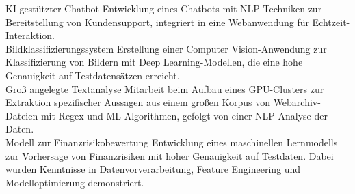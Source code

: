 \documentclass[9pt,a4paper,ragged2e,withhyper]{altacv}
\begin{document}
\begin{paracol}{2}
        \cvevent
            { KI-gestützter Chatbot }
            {  }
            {}
            {}
        Entwicklung eines Chatbots mit NLP-Techniken zur Bereitstellung von Kundensupport, integriert in eine Webanwendung für Echtzeit-Interaktion.\\
        \vspace{0.5em}
        \cvevent
            { Bildklassifizierungssystem }
            {  }
            {}
            {}
        Erstellung einer Computer Vision-Anwendung zur Klassifizierung von Bildern mit Deep Learning-Modellen, die eine hohe Genauigkeit auf Testdatensätzen erreicht.\\
        \vspace{0.5em}
        \cvevent
            { Groß angelegte Textanalyse }
            {  }
            {}
            {}
        Mitarbeit beim Aufbau eines GPU-Clusters zur Extraktion spezifischer Aussagen aus einem großen Korpus von Webarchiv-Dateien mit Regex und ML-Algorithmen, gefolgt von einer NLP-Analyse der Daten.\\
        \vspace{0.5em}
        \cvevent
            { Modell zur Finanzrisikobewertung }
            {  }
            {}
            {}
        Entwicklung eines maschinellen Lernmodells zur Vorhersage von Finanzrisiken mit hoher Genauigkeit auf Testdaten. Dabei wurden Kenntnisse in Datenvorverarbeitung, Feature Engineering und Modelloptimierung demonstriert.\\
        \vspace{0.5em}

        
    \end{paracol}
\end{document}
